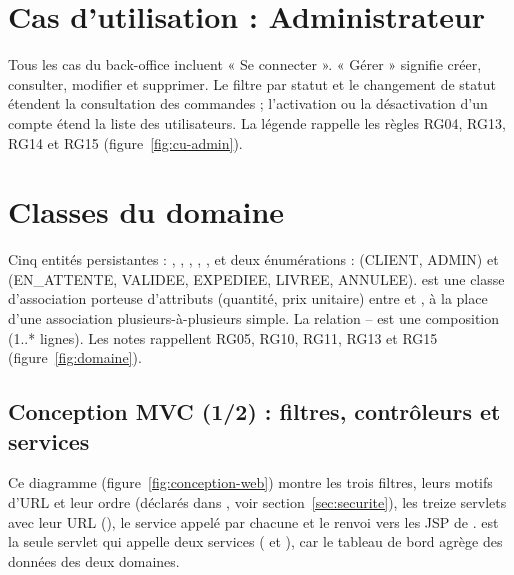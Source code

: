
\section{Cas d'utilisation : Administrateur}

Tous les cas du back-office incluent « Se connecter ». « Gérer » signifie créer, consulter, modifier et
supprimer. Le filtre par statut et le changement de statut étendent la consultation des commandes ;
l'activation ou la désactivation d'un compte étend la liste des utilisateurs. La légende rappelle les règles
RG04, RG13, RG14 et RG15 (figure~\ref{fig:cu-admin}).


\section{Classes du domaine}

Cinq entités persistantes : , , , , , et deux
énumérations :  (CLIENT, ADMIN) et  (EN\_ATTENTE, VALIDEE, EXPEDIEE, LIVREE, ANNULEE).
 est une classe d'association porteuse d'attributs (quantité, prix unitaire) entre
 et , à la place d'une association plusieurs-à-plusieurs simple. La relation
 –  est une composition (1..* lignes). Les notes rappellent RG05, RG10, RG11, RG13
et RG15 (figure~\ref{fig:domaine}).


\begin{landscape}
\section{Conception MVC (1/2) : filtres, contrôleurs et services}

Ce diagramme (figure~\ref{fig:conception-web}) montre les trois filtres, leurs motifs d'URL et leur ordre
(déclarés dans , voir section~\ref{sec:securite}), les treize servlets avec leur URL
(), le service appelé par chacune et le renvoi vers les JSP de .
 est la seule servlet qui appelle deux services ( et
), car le tableau de bord agrège des données des deux domaines.

\end{landscape}

